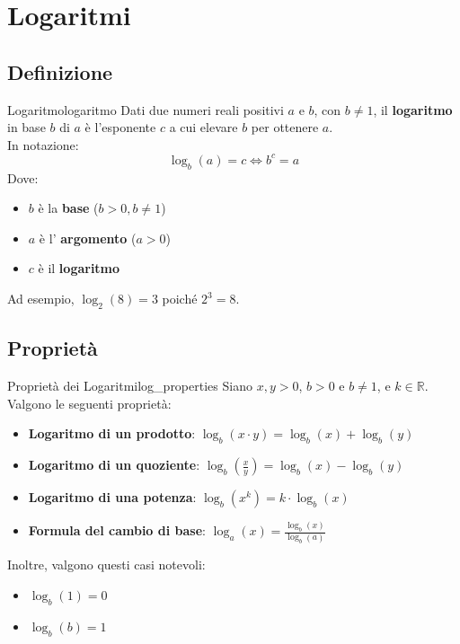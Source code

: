 \section{Logaritmi}

\subsection{Definizione}

\begin{definition}{Logaritmo}{logaritmo}
    Dati due numeri reali positivi $a$ e $b$, con $b \neq 1$, il \textbf{logaritmo} in base $b$ di $a$ è l'esponente $c$ a cui elevare $b$ per ottenere $a$. \\[1em]
    In notazione:
    $$ \log_b(a) = c \iff b^c = a $$
    Dove:
    \begin{itemize}
        \item $b$ è la \textbf{base} ($b > 0, b \neq 1$)
        \item $a$ è l' \textbf{argomento} ($a > 0$)
        \item $c$ è il \textbf{logaritmo}
    \end{itemize}
\end{definition}

Ad esempio, $\log_2(8) = 3$ poiché $2^3 = 8$.

\subsection{Proprietà}

\begin{theorem}{Proprietà dei Logaritmi}{log_properties}
    Siano $x, y > 0$, $b > 0$ e $b \neq 1$, e $k \in \mathbb{R}$. Valgono le seguenti proprietà:
    \begin{itemize}
        \item \textbf{Logaritmo di un prodotto}: $\log_b(x \cdot y) = \log_b(x) + \log_b(y)$
        \item \textbf{Logaritmo di un quoziente}: $\log_b\left(\frac{x}{y}\right) = \log_b(x) - \log_b(y)$
        \item \textbf{Logaritmo di una potenza}: $\log_b(x^k) = k \cdot \log_b(x)$
        \item \textbf{Formula del cambio di base}: $\log_a(x) = \frac{\log_b(x)}{\log_b(a)}$
    \end{itemize}
    Inoltre, valgono questi casi notevoli:
    \begin{itemize}
        \item $\log_b(1) = 0$
        \item $\log_b(b) = 1$
    \end{itemize}
\end{theorem}

